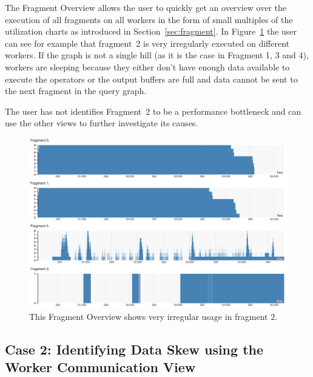 \documentclass{chi2009}
\newcommand*{\network}{Worker Communication\xspace}
\newcommand*{\overall}{Fragment Overview\xspace}
\begin{document}
The \overall allows the user to quickly get an overview over the execution of all fragments
on all workers in the form of small multiples of the utilization charts as introduced in
Section~\ref{sec:fragment}. In Figure~\ref{fig:overview_skew} the user can see for example
that fragment~2 is very irregularly executed on different workers. If the graph is not a
single hill (as it is the case in Fragment 1, 3 and 4), workers are sleeping because they
either don't have enough data available to execute the operators or the output buffers
are full and data cannot be sent to the next fragment in the query graph.

The user has not identifies Fragment~2 to be a performance bottleneck and can use the other views
to further investigate its causes.

\begin{figure}[ht]
  \includegraphics[width=\columnwidth]{images/overview_skew}
  \caption{This \overall shows very irregular usage in fragment 2.}
  \label{fig:overview_skew}
\end{figure}

\subsection{Case 2: Identifying Data Skew using the \network View}
\end{document}
